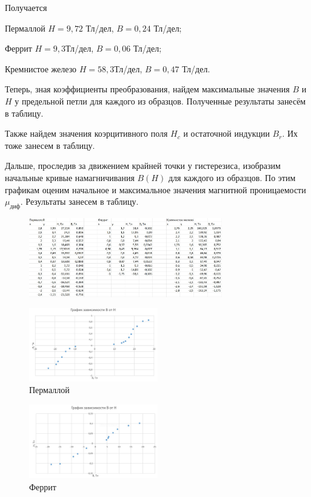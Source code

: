 \documentclass[a4paper,12pt]{article}
\begin{document}
Получается

Пермаллой $H = 9,72$ Тл/дел, $B = 0,24$ Тл/дел;

Феррит $H = 9,3 $Тл/дел, $B = 0,06$ Тл/дел;

Кремнистое железо $ H = 58,3$Тл/дел, $B = 0,47$ Тл/дел.

Теперь, зная коэффициенты преобразования, найдем максимальные значения $B$ и $H$ у предельной петли для каждого из образцов. Полученные результаты занесём в таблицу.

Также найдем значения коэрцитивного поля $H_c$ и остаточной индукции $B_r$. Их тоже занесем в таблицу.

Дальше, проследив за движением крайней точки у гистерезиса, изобразим начальные кривые намагничивания $B(H)$ для каждого из образцов. По этим графикам оценим начальное и максимальное значения магнитной проницаемости $\mu_\text{диф}$. Результаты занесем в таблицу.

\begin{figure}[H]
	\begin{center}
    \includegraphics[width=0.75\textwidth]{tablizagist.jpg}
	\end{center}
\end{figure}

\begin{figure}[H]
	\begin{center}
    \includegraphics[width=0.5\textwidth]{graphikgist1.jpg}
    \caption{Пермаллой}
\label{fig:foobar}
	\end{center}
\end{figure}

\begin{figure}[H]
	\begin{center}
    \includegraphics[width=0.5\textwidth]{graphikgist2.jpg}
    \caption{Феррит}
\label{fig:foobar}
	\end{center}
\end{figure}
\end{document}

